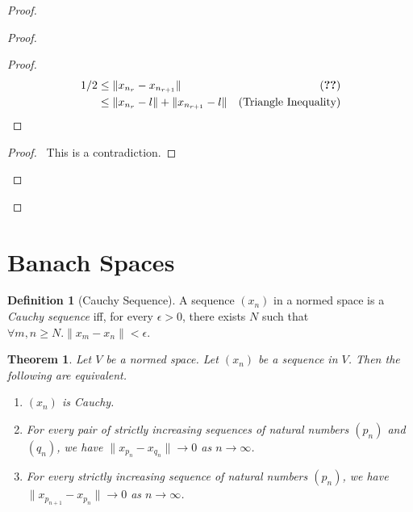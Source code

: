 \documentclass{book}
\let\qed\relax
\newtheorem{thm}[ax]{Theorem}
\theoremstyle{definition}
\newtheorem{df}[ax]{Definition}
\begin{document}
\begin{proof}
\begin{proof}
	\begin{proof}
		\pf
		\begin{align*}
			1/2 & \leq \| x_{n_r} - x_{n_{r+1}} \| & (\text{\stepref{b}}) \\
			& \leq \| x_{n_r} - l \| + \| x_{n_{r+1}} - l \| & (\text{Triangle Inequality})
		\end{align*}
	\end{proof}
	\qedstep
	\begin{proof}
		\pf\ This is a contradiction.
	\end{proof}
\end{proof}
\qed
\end{proof}

\section{Banach Spaces}

\begin{df}[Cauchy Sequence]
A sequence $(x_n)$ in a normed space is a \emph{Cauchy sequence} iff, for every $\epsilon > 0$, there exists $N$ such that $\forall m,n \geq N. \| x_m - x_n \| < \epsilon$.
\end{df}

\begin{thm}
\label{thm:Cauchy}
Let $V$ be a normed space. Let $(x_n)$ be a sequence in $V$. Then the following are equivalent.
\begin{enumerate}
\item $(x_n)$ is Cauchy.
\item For every pair of strictly increasing sequences of natural numbers $(p_n)$ and $(q_n)$, we have $\| x_{p_n} - x_{q_n} \| \rightarrow 0$ as $n \rightarrow \infty$.
\item For every strictly increasing sequence of natural numbers $(p_n)$, we have $\| x_{p_{n+1}} - x_{p_n} \| \rightarrow 0$ as $n \rightarrow \infty$.
\end{enumerate}
\end{thm}
\end{document}
